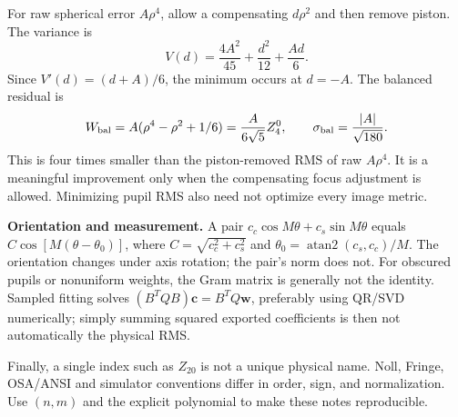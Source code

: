 For raw spherical error $A\rho^4$, allow a compensating $d\rho^2$ and then remove piston. The variance is
\begin{equation}
V(d)=\frac{4A^2}{45}+\frac{d^2}{12}+\frac{Ad}{6}.
\end{equation}
Since $V'(d)=(d+A)/6$, the minimum occurs at $d=-A$. The balanced residual is
\begin{equation}
W_{\rm bal}=A(\rho^4-\rho^2+1/6)=\frac{A}{6\sqrt5}Z_4^0,
\qquad \sigma_{\rm bal}=\frac{|A|}{\sqrt{180}}.
\end{equation}
This is four times smaller than the piston-removed RMS of raw $A\rho^4$. It is a meaningful improvement only when the compensating focus adjustment is allowed. Minimizing pupil RMS also need not optimize every image metric.

\textbf{Orientation and measurement.} A pair $c_c\cos M\theta+c_s\sin M\theta$ equals
$C\cos[M(\theta-\theta_0)]$, where $C=\sqrt{c_c^2+c_s^2}$ and
$\theta_0=\operatorname{atan2}(c_s,c_c)/M$. The orientation changes under axis rotation; the pair's norm does not. For obscured pupils or nonuniform weights, the Gram matrix is generally not the identity. Sampled fitting solves
$(B^TQB)\mathbf c=B^TQ\mathbf w$, preferably using QR/SVD numerically; simply summing squared exported coefficients is then not automatically the physical RMS.

Finally, a single index such as $Z_{20}$ is not a unique physical name. Noll, Fringe, OSA/ANSI and simulator conventions differ in order, sign, and normalization. Use $(n,m)$ and the explicit polynomial to make these notes reproducible.

